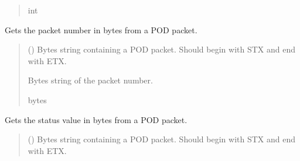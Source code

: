 \documentclass[letterpaper,10pt,english]{sphinxmanual}
\begin{document}
\begin{fulllineitems}
\begin{fulllineitems}
\begin{quote}
\begin{description}
\sphinxAtStartPar
int

\end{description}\end{quote}

\end{fulllineitems}


\begin{fulllineitems}
\label{\detokenize{Morelia.Packets:Morelia.Packets.Binary5.PacketBinary5.GetPacketNumber}}
\pysigstartsignatures
{}
\pysigstopsignatures
\sphinxAtStartPar
Gets the packet number in bytes from a POD packet.
\begin{quote}\begin{description}
\sphinxAtStartPar
{} () \textendash{} Bytes string containing a POD packet. Should begin with STX and                 end with ETX.

\sphinxAtStartPar
Bytes string of the packet number.

\sphinxAtStartPar
bytes

\end{description}\end{quote}

\end{fulllineitems}


\begin{fulllineitems}
\label{\detokenize{Morelia.Packets:Morelia.Packets.Binary5.PacketBinary5.GetStatus}}
\pysigstartsignatures
{}
\pysigstopsignatures
\sphinxAtStartPar
Gets the status value in bytes from a POD packet.
\begin{quote}\begin{description}
\sphinxAtStartPar
{} () \textendash{} Bytes string containing a POD packet. Should begin with STX and                 end with ETX.


\end{description}
\end{quote}
\end{fulllineitems}
\end{fulllineitems}
\end{document}
